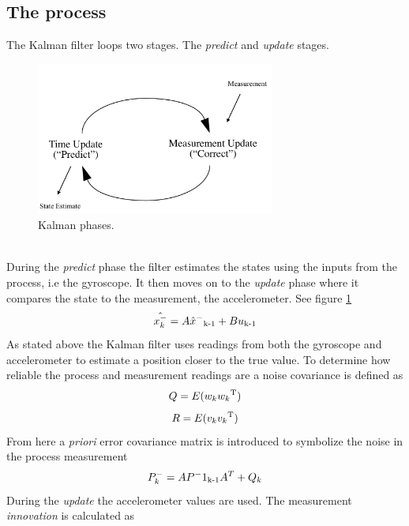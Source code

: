 \documentclass[a4paper,11pt]{kth-mag}
\begin{document}
\subsection{The process} 
The Kalman filter loops two stages. The \textit{predict} and \textit{update} stages.
\begin{figure}[!htb] 
\centering
\includegraphics[width = 0.7\textwidth]{Kalmanphasepic.jpg}
\caption{Kalman phases.}
\label{figure : Kalman phases}
\end{figure}
\\ During the \textit{predict} phase the filter estimates the states using the inputs from the process, i.e the gyroscope. It then moves on to the \textit{update} phase where it compares the state to the measurement, the accelerometer. See figure \ref{figure : Kalman phases}
\begin{equation} \label{eq:Kalman first estimate}
\hat{x^-_k} = A\hat{x}^-\textsubscript{k-1}+Bu\textsubscript{k-1}
\end{equation}
As stated above the Kalman filter uses readings from both the gyroscope and accelerometer to estimate a position closer to the true value. To determine how reliable the process and measurement readings are a noise covariance is defined as
\begin{equation} \label{eq:covariance process noise}
Q = E(w_k w_k \textsuperscript{T})
\end{equation}
\begin{equation} \label{eq:covariance measurement noise}
R = E(v_k v_k \textsuperscript{T} )
\end{equation}
From here a \textit{priori} error covariance matrix is introduced to symbolize the noise in the process measurement
\begin{equation}
P^-_k = AP^-1\textsubscript{k-1}A^T + Q_k
\end{equation}
During the \textit{update} the accelerometer values are used. The measurement \textit{innovation} is calculated as
\end{document}
